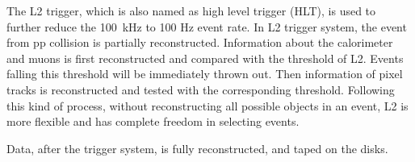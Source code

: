 The L2 trigger, which is also named as high level trigger (HLT), is used to further reduce the 100~kHz to 
100 Hz event rate. 
In L2 trigger system, the event from pp collision is partially reconstructed. 
Information about the calorimeter and muons is first reconstructed and compared with the threshold of L2. Events falling this threshold will be immediately thrown out. Then information of pixel tracks is reconstructed and tested with the corresponding threshold. Following this kind of process, without reconstructing all possible objects in an event, L2 is more flexible and has complete freedom in selecting events. 

Data, after the trigger system, is fully reconstructed, and taped on the disks. 
  









  



  



 
 
 






